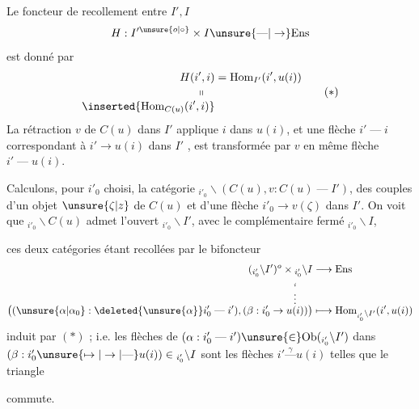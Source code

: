 
Le foncteur de recollement entre $I',I$
\[
H:I'^{\unsure{o|\circ}}\times I\unsure{\text{---}|\to}\mathrm{Ens}
\]
est donné par
\[
\begin{aligned}
H(i',i)&=\mathrm{Hom}_{I'}(i',u(i))\\[-2pt]
\shortparallel\quad&\\[-2pt]
\inserted{\mathrm{Hom}_{C(u)}(i',i)}&
\end{aligned}
\tag*{$(*)$}
\]
La rétraction $v$ de $C(u)$ dans $I'$ applique
$i$ dans $u(i)$, et une flèche $i'\mathrel{\text{---}}i$
correspondant à $i'\longrightarrow u(i)$ dans $I'$ , est transformée
par $v$ en  même flèche $i'\mathrel{\text{---}}u(i)$.

Calculons, pour $i'_0$ choisi, la catégorie
$\mathord{}_{i'_0}\backslash(C(u),v:C(u)\mathrel{\text{---}}I')$, des couples d'un
objet $\unsure{\zeta|z}$ de $C(u)$ et d'une flèche
$i'_0\longrightarrow v(\zeta)$ dans $I'$. On voit que $\mathord{}_{i'_0}\backslash C(u)$
admet l'ouvert $\mathord{}_{i'_0}\backslash I'$, avec
le complémentaire fermé $\mathord{}_{i'_0}\backslash I$,


ces deux catégories
étant recollées par le bifoncteur
\[
\begin{aligned}
(\mathord{}_{i'_0}\backslash I')^o\times \mathord{}_{i'_0}\backslash I&\longrightarrow\mathrm{Ens}\\
\big((\unsure{\alpha|\alpha_0}:\deleted{\unsure{\alpha}}i'_0\mathrel{\text{---}}i'),(\beta:i'_0\to\overset{\overset{i}{\vdots}}{u(i)})\big)
&\longmapsto\mathrm{Hom}_{\mathord{}_{i'_0}\backslash I'}(i',u(i))
\end{aligned}
\]
induit par $(*)$ ; i.e. les flèches de
$(\alpha:i'_0\mathrel{\text{---}}i')\unsure{\in}\mathrm{Ob}(\mathord{}_{i'_0}\backslash I')$ dans $(\beta:i'_0\unsure{\mapsto|\to|\text{---}}u(i))\in\mathord{}_{i'_0}\backslash I$
sont les flèches $i'\overset{\gamma}{\text{---}}u(i)$ telles que le
triangle


commute.
